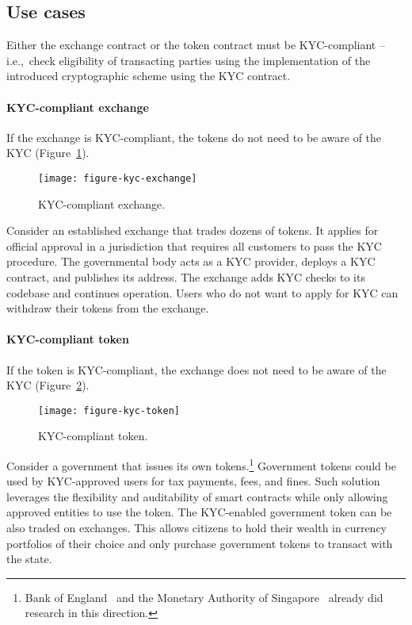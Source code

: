 \subsection{Use cases}

Either the exchange contract or the token contract must be KYC-compliant -- i.e.,~check eligibility of transacting parties using the implementation of the introduced cryptographic scheme using the KYC contract.

\paragraph{KYC-compliant exchange}

If the exchange is KYC-compliant, the tokens do not need to be aware of the KYC (Figure~\ref{fig:KYCCompliantExchange}).

\begin{figure}[h]
	\centering
	\texttt{[image: figure-kyc-exchange]}
	\caption{KYC-compliant exchange.}
	\label{fig:KYCCompliantExchange}
\end{figure}

Consider an established exchange that trades dozens of tokens.
It applies for official approval in a jurisdiction that requires all customers to pass the KYC procedure.
The governmental body acts as a KYC provider, deploys a KYC contract, and publishes its address.
The exchange adds KYC checks to its codebase and continues operation.
Users who do not want to apply for KYC can withdraw their tokens from the exchange.


\paragraph{KYC-compliant token}

If the token is KYC-compliant, the exchange does not need to be aware of the KYC (Figure~\ref{fig:KYCCompliantToken}).

\begin{figure}[h]
	\centering
	\texttt{[image: figure-kyc-token]}
	\caption{KYC-compliant token.}
	\label{fig:KYCCompliantToken}
\end{figure}

Consider a government that issues its own tokens.\footnote{Bank of England~\cite{Danezis2016} and the Monetary Authority of Singapore~\cite{Singapore17} already did research in this direction.}
Government tokens could be used by KYC-approved users for tax payments, fees, and fines.
Such solution leverages the flexibility and auditability of smart contracts while only allowing approved entities to use the token.
The KYC-enabled government token can be also traded on exchanges.
This allows citizens to hold their wealth in currency portfolios of their choice and only purchase government tokens to transact with the state.

